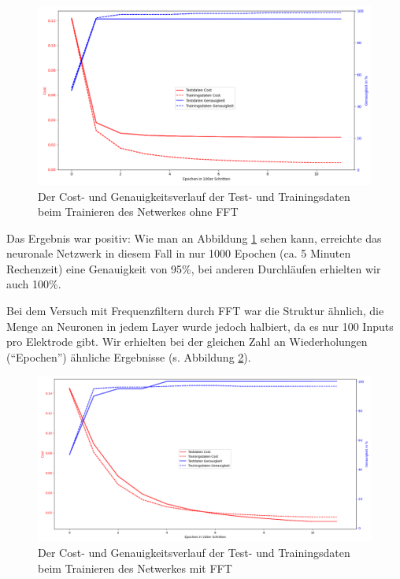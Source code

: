 \documentclass[10pt]{scrartcl}
\begin{document}
	\begin{figure}[h!]
		\includegraphics[width=\textwidth]{pictures/training-nofft.png}
		\caption{Der Cost- und Genauigkeitsverlauf der Test- und Trainingsdaten beim Trainieren des Netwerkes ohne FFT}
		\label{training-nofft}
	\end{figure}

	Das Ergebnis war positiv: Wie man an Abbildung \ref{training-nofft} sehen kann, erreichte das neuronale Netzwerk in diesem Fall in nur 1000 Epochen (ca. 5 Minuten Rechenzeit) eine Genauigkeit von 95\%, bei anderen Durchläufen erhielten wir auch 100\%.

	Bei dem Versuch mit Frequenzfiltern durch FFT war die Struktur ähnlich, die Menge an Neuronen in jedem Layer wurde jedoch halbiert, da es nur 100 Inputs pro Elektrode gibt. Wir erhielten bei der gleichen Zahl an Wiederholungen (\enquote{Epochen}) ähnliche Ergebnisse (s. Abbildung \ref{training-fft}).

	\begin{figure}[H]
		\includegraphics[width=\textwidth]{pictures/training-fft2.png}
		\caption{Der Cost- und Genauigkeitsverlauf der Test- und Trainingsdaten beim Trainieren des Netwerkes mit FFT}
		\label{training-fft}
	\end{figure}
\end{document}
